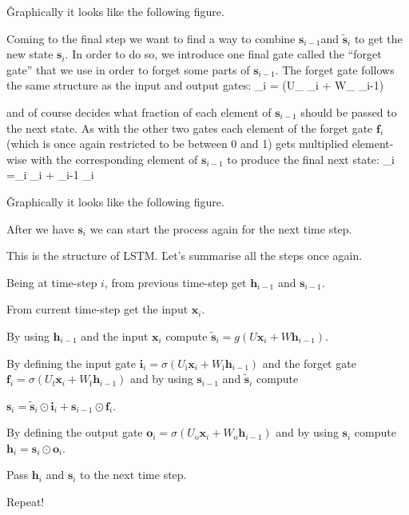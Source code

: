 \v

Graphically it looks like the following figure.


Coming to the final step we want to find a way to combine $\boldsymbol{s}_{i-1}$and $\boldsymbol{\tilde{s}}_i$ to get
the new state $\boldsymbol{s}_{i}$. In order to do so, we introduce one final gate called the ``forget gate'' that we
use in order to forget some parts of $\boldsymbol{s}_{i-1}$. The forget gate follows the same structure as the input
and output gates:
\bse
{}_{i} = \sigma(U_{} _{i} + W_{} _{i-1})
\ese

and of course decides what fraction of each element of $\boldsymbol{s}_{i-1}$ should be passed to the next state. As
with the other two gates each element of the forget gate $\boldsymbol{f}_{i} $ (which is once again restricted to be
between 0 and 1) gets multiplied element-wise with the corresponding element of $\boldsymbol{s}_{i-1}$ to produce the
final next state:
\bse
{}_{i} =_i \odot {}_{i} + _{i-1} \odot {}_{i}
\ese

\v

Graphically it looks like the following figure.


After we have $\boldsymbol{s}_{i} $ we can start the process again for the next time step.


This is the structure of LSTM. \v

Let's summarise all the steps once again.
\ben
\item Being at time-step $i$, from previous time-step get $\boldsymbol{h}_{i-1}$ and $\boldsymbol{s}_{i-1}$.
\item From current time-step get the input $\boldsymbol{x}_{i}$.
\item By using $\boldsymbol{h}_{i-1}$ and the input $\boldsymbol{x}_{i}$ compute $\boldsymbol{\tilde{s}}_i = g
(U\boldsymbol{x}_i + W \boldsymbol{h}_{i-1})$.
\item By defining the input gate $\boldsymbol{i}_{i} = \sigma(U_{\text{i}} \boldsymbol{x}_{i} + W_{\text{i}}
\boldsymbol{h}_{i-1})$ and the forget gate $\boldsymbol{f}_{i} = \sigma (U_{\text{f}} \boldsymbol{x}_{i} +
W_{\text{f}} \boldsymbol{h}_{i-1})$ and by using $\boldsymbol{s}_{i-1}$ and $\boldsymbol{\tilde{s}}_i$ compute
\item $\boldsymbol{s}_{i} =\boldsymbol{\tilde{s}}_i\odot \boldsymbol{i}_{i} + \boldsymbol{s}_{i-1} \odot
\boldsymbol{f}_{i}$.
\item By defining the output gate $\boldsymbol{o}_{i} = \sigma (U_{\text{o}} \boldsymbol{x}_{i} + W_{\text{o}}
\boldsymbol{h}_{i-1})$ and by using $\boldsymbol{s}_{i}$ compute $\boldsymbol{h}_{i} = \boldsymbol{s}_{i} \odot
\boldsymbol{o}_{i}$.
\item Pass $\boldsymbol{h}_{i}$ and $\boldsymbol{s}_{i}$ to the next time step.
\item Repeat!
\een

